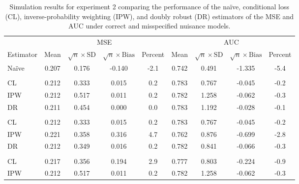 \begin{table}[t]
    \centering
    \footnotesize
    \caption{Simulation results for experiment 2 comparing the performance of the na\"{i}ve, conditional loss (CL), inverse-probability weighting (IPW), and doubly robust (DR) estimators of the MSE and AUC under correct and misspecified nuisance models.}
 
\begin{threeparttable}
    \begin{tabular}{lcccccccc}
    \toprule
    \multicolumn{1}{c}{ } & \multicolumn{4}{c}{MSE} & \multicolumn{4}{c}{AUC} \\
    \cmidrule(l{3pt}r{3pt}){2-5} \cmidrule(l{3pt}r{3pt}){6-9}
    Estimator & Mean & $\sqrt{n}\times\text{SD}$ & $\sqrt{n}\times\text{Bias}$ & Percent & Mean & $\sqrt{n}\times\text{SD}$ & $\sqrt{n}\times\text{Bias}$ & Percent\\
    \midrule
    Na\"{i}ve & 0.207 & 0.176 & -0.140 & -2.1 & 0.742 & 0.491 & -1.335 & -5.4\\
    \addlinespace[0.3em]
    \multicolumn{9}{l}{Correct}\\
    \hspace{1em}CL & 0.212 & 0.333 & 0.015 & 0.2 & 0.783 & 0.767 & -0.045 & \vphantom{1} -0.2\\
    \hspace{1em}IPW & 0.212 & 0.517 & 0.011 & 0.2 & 0.782 & 1.258 & -0.062 & \vphantom{1} -0.3\\
    \hspace{1em}DR & 0.211 & 0.454 & 0.000 & 0.0 & 0.783 & 1.192 & -0.028 & -0.1\\
    \addlinespace[0.3em]
    \multicolumn{9}{l}{$e_a(X)$ misspecified}\\
    \hspace{1em}CL & 0.212 & 0.333 & 0.015 & 0.2 & 0.783 & 0.767 & -0.045 & -0.2\\
    \hspace{1em}IPW & 0.221 & 0.358 & 0.316 & 4.7 & 0.762 & 0.876 & -0.699 & -2.8\\
    \hspace{1em}DR & 0.212 & 0.349 & 0.016 & 0.2 & 0.782 & 0.841 & -0.066 & -0.3\\
    \addlinespace[0.3em]
    \multicolumn{9}{l}{$h_a(X)$ misspecified}\\
    \hspace{1em}CL & 0.217 & 0.356 & 0.194 & 2.9 & 0.777 & 0.803 & -0.224 & -0.9\\
    \hspace{1em}IPW & 0.212 & 0.517 & 0.011 & 0.2 & 0.782 & 1.258 & -0.062 & -0.3\\

\end{tabular}
\end{threeparttable}
\end{table}
